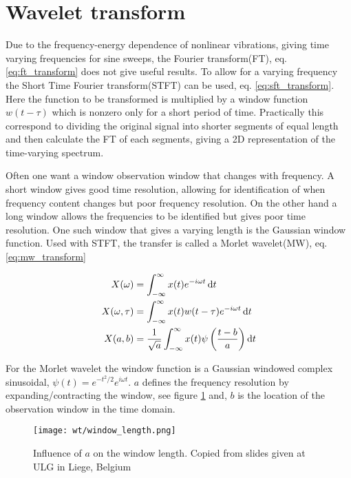 
\section{Wavelet transform}
\label{sec:wavelet_transform}

Due to the frequency-energy dependence of nonlinear vibrations, giving time
varying frequencies for sine sweeps, the Fourier transform(FT), eq.
\eqref{eq:ft_transform} does not give useful results.
To allow for a varying frequency the Short Time Fourier transform(STFT) can be
used, eq. \eqref{eq:sft_transform}. Here the function to be transformed is
multiplied by a window function $w(t-\tau)$ which is nonzero only for a short
period of time. Practically this correspond to dividing the original signal into
shorter segments of equal length and then calculate the FT of each segments,
giving a 2D representation of the time-varying spectrum.

Often one want a window observation window that changes with frequency. A short
window gives good time resolution, allowing for identification of when frequency
content changes but poor frequency resolution. On the other hand a long window
allows the frequencies to be identified but gives poor time resolution. One such
window that gives a varying length is the Gaussian window function. Used with
STFT, the transfer is called a Morlet wavelet(MW), eq. \eqref{eq:mw_transform}


\begin{align}
  X(\omega) &= \int_{-\infty}^\infty x(t) e^{-i\omega t} \operatorname{d}\! t
              \label{eq:ft_transform}\\
  X(\omega, \tau) &= \int_{-\infty}^\infty x(t) w(t-\tau)  e^{-i\omega t} \operatorname{d}\! t
                    \label{eq:sft_transform}\\
  X(a, b) &= \frac{1}{\sqrt{a}} \int_{-\infty}^\infty x(t) \psi\left(\frac{t-b}{a} \right) \operatorname{d}\! t
            \label{eq:mw_transform}
\end{align}

For the Morlet wavelet the window function is a Gaussian windowed complex
sinusoidal, $\psi(t) = e^{-t^2/2}e^{i\omega t}$. $a$ defines the frequency
resolution by expanding/contracting the window, see figure
\ref{fig:mw_window_length} and, $b$ is the location of the observation window in
the time domain.

\begin{figure}[!ht]
  \centering
  \texttt{[image: wt/window\_length.png]}
  \caption{Influence of $a$ on the window length. Copied from slides given at
    ULG in Liege, Belgium}
  \label{fig:mw_window_length}
\end{figure}


